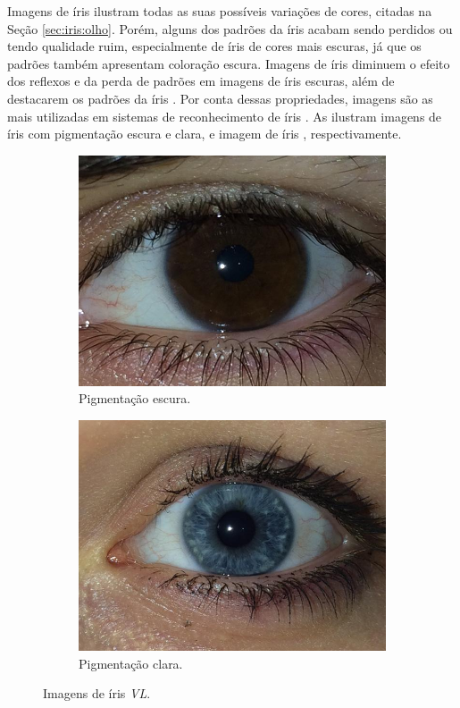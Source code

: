 \par Imagens \textit{} de íris ilustram todas as suas possíveis variações de cores, citadas na Seção \ref{sec:iris:olho}. Porém, alguns dos padrões da íris acabam sendo perdidos ou tendo qualidade ruim, especialmente de íris de cores mais escuras, já que os padrões também apresentam coloração escura. Imagens de íris  diminuem o efeito dos reflexos e da perda de padrões em imagens de íris escuras, além de destacarem os padrões da íris \cite{abdullah2015}. Por conta dessas propriedades, imagens  são as mais utilizadas em sistemas de reconhecimento de íris \cite{daugman2004}. As  ilustram imagens de íris \textit{} com pigmentação escura e clara, e imagem de íris \textit{}, respectivamente.

\begin{figure}[h!]
\centering
\begin{subfigure}{.5\textwidth}
  \centering
  \includegraphics[width=.5\linewidth]{img/iris_vl_escura}
  \caption{Pigmentação escura.}\label{fig:iris_vl_escura}
\end{subfigure}%
\begin{subfigure}{.5\textwidth}
  \centering
  \includegraphics[width=.5\linewidth]{img/iris_vl_clara}
  \caption{Pigmentação clara.}\label{fig:iris_vl_clara}
\end{subfigure}
\caption{Imagens de íris \textit{\acrshort{VL}}.}
\label{fig:pigmentacoes}
\end{figure}

